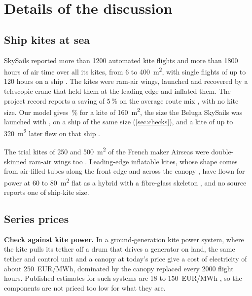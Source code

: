\section{Details of the discussion}
\label{sec:disc_details}

\subsection{Ship kites at sea}
\label{sec:disc_details_kites}

SkySails reported more than \num{1200} automated kite flights and more than \num{1800} hours of air time over all its kites, from 6 to \SI{400}{m^2}, with single flights of up to 120 hours on a ship \citep{skysails2018}. The kites were ram-air wings, launched and recovered by a telescopic crane that held them at the leading edge and inflated them. The project record reports a saving of 5\,\% on the average route mix \citep{wintecc2009_record}, with no kite size. Our model gives \,\% for a kite of \SI{160}{m^2}, the size the Beluga SkySails was launched with \citep{wiwo2008}, on a ship of the same size (\cref{sec:checks}), and a kite of up to \SI{320}{m^2} later flew on that ship \citep{wrage2018}.

The trial kites of 250 and \SI{500}{m^2} of the French maker Airseas \citep{airseas_cp2022} were double-skinned ram-air wings too \citep{noaa2009,airseas_seawing_web}. Leading-edge inflatable kites, whose shape comes from air-filled tubes along the front edge and across the canopy \citep{poland2025}, have flown for power at 60 to \SI{80}{m^2} flat as a hybrid with a fibre-glass skeleton \citep{kitepower2024}, and no source reports one of ship-kite size.

\subsection{Series prices}
\label{sec:disc_details_prices}

\textbf{Check against kite power.} In a ground-generation kite power system, where the kite pulls its tether off a drum that drives a generator on land, the same tether and control unit and a canopy at today's price give a cost of electricity of about 250~EUR/MWh, dominated by the canopy replaced every \num{2000} flight hours. Published estimates for such systems are 18 to 150~EUR/MWh \citep{joshi2025}, so the components are not priced too low for what they are.

